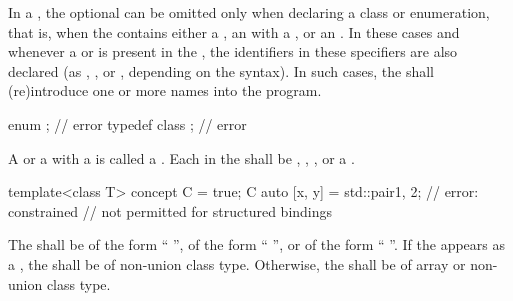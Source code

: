\pnum
{}%
%
In a , the optional
 can be omitted only when declaring a
class or enumeration, that is,
when the  contains either a
, an  with
a , or an
. In these cases and whenever a
 or  is present in
the , the identifiers in these specifiers
are also declared (as
, , or
, depending on the syntax). In such cases,
the  shall (re)introduce one or more names into
the program.
\begin{example}
\begin{codeblock}
enum { };           // error
typedef class { };  // error
\end{codeblock}
\end{example}

\pnum
A  or a 
with a  is called
a .
Each  in the 
shall be
,
,
, or
a .
\begin{example}
\begin{codeblock}
template<class T> concept C = true;
C auto [x, y] = std::pair{1, 2};    // error: constrained 
                                    // not permitted for structured bindings
\end{codeblock}
\end{example}
The  shall be
of the form ``\tcode{=} '',
of the form ``\tcode{\{}  \tcode{\}}'',
or
of the form ``\tcode{(}  \tcode{)}''.
If the  appears as
a ,
the  shall be of non-union class type.
Otherwise,
the  shall be of
array or non-union class type.

